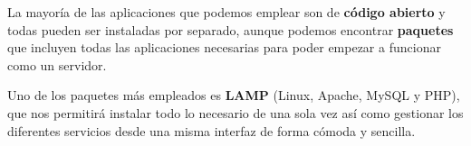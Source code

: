 La mayoría de las aplicaciones que podemos emplear son de \textbf{código abierto} y todas pueden ser instaladas por separado, aunque podemos encontrar \textbf{paquetes} que incluyen todas las aplicaciones necesarias para poder empezar a funcionar como un servidor.

Uno de los paquetes más empleados es \textbf{LAMP} (Linux, Apache, MySQL y PHP), que nos permitirá instalar todo lo necesario de una sola vez así como gestionar los diferentes servicios desde una misma interfaz de forma cómoda y sencilla.



\glsaddall
\printglossaries


\newpage
{}



